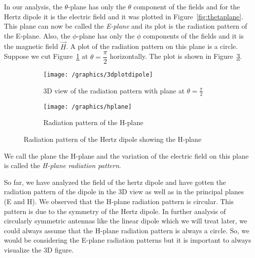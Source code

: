 In our analysis, the $\theta$-plane has only the $\theta$ component of the fields and for the Hertz dipole it is the electric field and it was plotted in Figure~\ref{fig:thetaplane}. This plane can now be called the \emph{E-plane} and its plot is the radiation pattern of the E-plane. Also, the $\phi$-plane has only the $\phi$ components of the fields and it is the magnetic field $\vec{H}$. A plot of the radiation pattern on this plane is a circle. Suppose we cut Figure~\ref{fig:3dplotdipole} at $\theta=\dfrac{\pi}{2}$ horizontally. The plot is shown in Figure~\ref{fig:phiplane}.
\begin{figure}[h]
\centering
\begin{subfigure}[a]{1\linewidth}
\texttt{[image: /graphics/3dplotdipole]}
\caption{3D view of the radiation pattern with plane at $\theta=\frac{\pi}{2}$}
\label{fig:3dplotdipole}
\end{subfigure}
\begin{subfigure}[b]{1\linewidth}
\texttt{[image: /graphics/hplane]}
\caption{Radiation pattern of the H-plane}
\label{fig:phiplane}
\end{subfigure}
\caption{Radiation pattern of the Hertz dipole showing the H-plane}
\end{figure}

We call the plane the H-plane and the variation of the electric field on this plane is called the \emph{H-plane radiation pattern}.

So far, we have analyzed the field of the hertz dipole and have gotten the radiation pattern of the dipole in the 3D view as well as in the principal planes (E and H). We observed that the H-plane radiation pattern is circular. This pattern is due to the symmetry of the Hertz dipole. In further analysis of circularly symmetric antennas like the linear dipole which we will treat later, we could always assume that the H-plane radiation pattern is always a circle. So, we would be considering the E-plane radiation patterns but it is important to always visualize the 3D figure.

